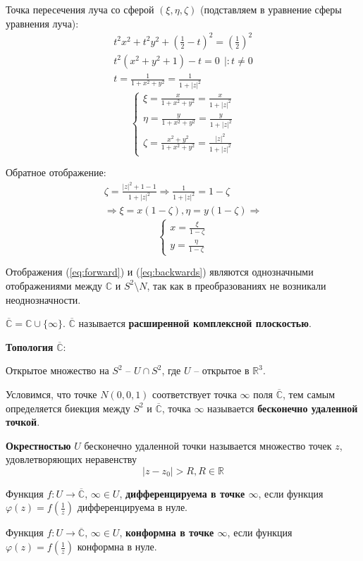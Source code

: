 Точка пересечения луча со сферой $(\xi,\eta,\zeta)$ (подставляем в уравнение сферы уравнения луча):
\begin{gather*}
  t^2x^2 + t^2y^2 + \left(\frac{1}{2} - t\right)^2 = \left(\frac{1}{2}\right)^2 \\
  t^2(x^2 + y^2 + 1) - t = 0~~ | : t \neq 0 \\
  t = \frac{1}{1+x^2+y^2} = \frac{1}{1+|z|^2}
\end{gather*}
\begin{equation} \label{eq:forward}
\begin{cases}
  \xi = \frac{x}{1+x^2 + y^2} = \frac{x}{1+|z|^2} \\
  \eta = \frac{y}{1+x^2 + y^2} = \frac{y}{1+|z|^2} \\
  \zeta = \frac{x^2 + y^2}{1+x^2 + y^2} = \frac{|z|^2}{1+|z|^2}
\end{cases}
\end{equation}

Обратное отображение:
\begin{gather*}
\zeta = \frac{|z|^2 + 1 - 1}{1+|z|^2} \Rightarrow \frac{1}{1 + |z|^2} = 1 - \zeta \\
\Rightarrow \xi = x(1 - \zeta), \eta = y(1 - \zeta)
\Rightarrow 
\end{gather*}
\begin{equation}\label{eq:backwards}
\begin{cases}
  x = \frac{\xi}{1 - \zeta} \\
  y = \frac{\eta}{1 - \zeta}
\end{cases}
\end{equation}

Отображения (\ref{eq:forward}) и (\ref{eq:backwards}) являются однозначными отображениями между $\mathbb{C}$ и $S^2 \setminus N$, так как в преобразованиях не возникали неоднозначности.

$\overline{\mathbb{C}} = \mathbb{C} \cup \{\infty\}$. $\overline{\mathbb{C}}$ называется \textbf{расширенной комплексной плоскостью}. 

\textbf{Топология} $\overline{\mathbb{C}}$:

Открытое множество на $S^2$ -- $U \cap S^2$, где $U$ -- открытое в $\mathbb{R}^3$.

Условимся, что точке $N(0,0,1)$ соответствует точка $\infty$ поля $\overline{\mathbb{C}}$, тем самым определяется биекция между $S^2$ и $\overline{\mathbb{C}}$, точка $\infty$ называется \textbf{бесконечно удаленной точкой}.

\textbf{Окрестностью} $U$ бесконечно удаленной точки называется множество точек $z$, удовлетворяющих неравенству
$$
|z - z_0| > R, R\in \mathbb{R}
$$

Функция $f: U \rightarrow \overline{\mathbb{C}}$, $\infty\in U$, \textbf{дифференцируема в точке $\infty$}, если функция $\varphi(z) = f\left(\frac{1}{z}\right)$ дифференцируема в нуле.

Функция $f: U \rightarrow \overline{\mathbb{C}}$, $\infty\in U$, \textbf{конформна в точке $\infty$}, если функция $\varphi(z) = f\left(\frac{1}{z}\right)$ конформна в нуле.
